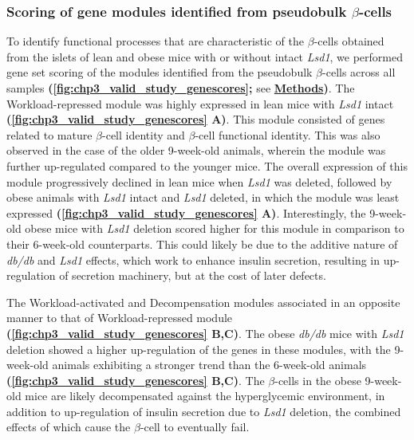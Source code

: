 
\subsubsection{\large Scoring of gene modules identified from pseudobulk $\beta$-cells}

\par To identify functional processes that are characteristic of the $\beta$-cells obtained from the islets of lean and obese mice with or without intact \textit{Lsd1}, we performed gene set scoring of the modules identified from the pseudobulk $\beta$-cells across all samples \textbf{(\autoref{fig:chp3_valid_study_genescores};} see \textbf{\hyperref[subsubsec:met_chp3_scoring]{Methods})}. The Workload-repressed module was highly expressed in lean mice with \textit{Lsd1} intact \textbf{(\autoref{fig:chp3_valid_study_genescores} A)}. This module consisted of genes related to mature $\beta$-cell identity and $\beta$-cell functional identity. This was also observed in the case of the older 9-week-old animals, wherein the module was further up-regulated compared to the younger mice. The overall expression of this module progressively declined in lean mice when \textit{Lsd1} was deleted, followed by obese animals with \textit{Lsd1} intact and \textit{Lsd1} deleted, in which the module was least expressed \textbf{(\autoref{fig:chp3_valid_study_genescores} A)}. Interestingly, the 9-week-old obese mice with \textit{Lsd1} deletion scored higher for this module in comparison to their 6-week-old counterparts. This could likely be due to the additive nature of \textit{db/db} and \textit{Lsd1} effects, which work to enhance insulin secretion, resulting in up-regulation of secretion machinery, but at the cost of later defects.\\


\par The Workload-activated and Decompensation modules associated in an opposite manner to that of Workload-repressed module \textbf{(\autoref{fig:chp3_valid_study_genescores} B,C)}. The obese \textit{db/db} mice with \textit{Lsd1} deletion showed a higher up-regulation of the genes in these modules, with the 9-week-old animals exhibiting a stronger trend than the 6-week-old animals \textbf{(\autoref{fig:chp3_valid_study_genescores} B,C)}. The $\beta$-cells in the obese 9-week-old mice are likely decompensated against the hyperglycemic environment, in addition to up-regulation of insulin secretion due to \textit{Lsd1} deletion, the combined effects of which cause the $\beta$-cell to eventually fail.

